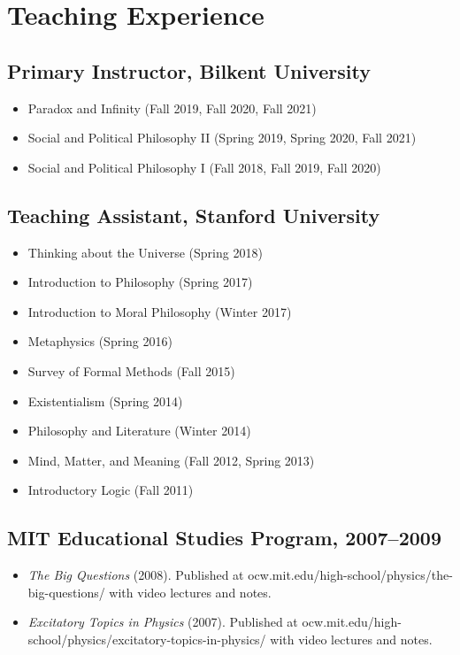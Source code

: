 \documentclass[11pt,letterpaper]{article}
\begin{document}
\section*{Teaching Experience}
\subsection*{Primary Instructor, Bilkent University}
\begin{itemize}
    \item Paradox and Infinity (Fall 2019, Fall 2020, Fall 2021)
    \item Social and Political Philosophy II (Spring 2019, Spring 2020, Fall 2021)
    \item Social and Political Philosophy I (Fall 2018, Fall 2019, Fall 2020)
\end{itemize}

\subsection*{Teaching Assistant, Stanford University}
\begin{itemize}
    \item Thinking about the Universe (Spring 2018)
    \item Introduction to Philosophy (Spring 2017)
    \item Introduction to Moral Philosophy (Winter 2017)
    \item Metaphysics (Spring 2016)
    \item Survey of Formal Methods (Fall 2015)
    \item Existentialism (Spring 2014)
    \item Philosophy and Literature (Winter 2014)
    \item Mind, Matter, and Meaning (Fall 2012, Spring 2013)
    \item Introductory Logic (Fall 2011)
\end{itemize}

\subsection*{MIT Educational Studies Program, 2007--2009}
\begin{itemize}
    \item \textit{The Big Questions} (2008). Published at ocw.mit.edu/high-school/physics/the-big-questions/ with video lectures and notes.
    \item \textit{Excitatory Topics in Physics} (2007). Published at ocw.mit.edu/high-school/physics/excitatory-topics-in-physics/ with video lectures and notes.
\end{itemize}
\end{document}
